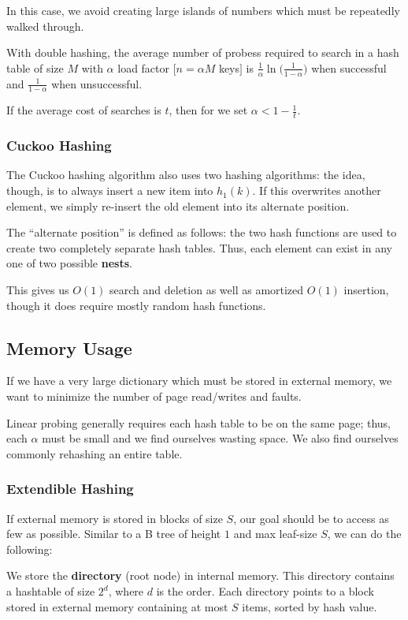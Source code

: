 \documentclass[12pt]{article}
\begin{document}
In this case, we avoid creating large islands of numbers which must be repeatedly walked through.

\begin{theorem}
With double hashing, the average number of probess required to search in a hash table of size $M$ with $\alpha$ load factor $[n = \alpha M$ keys$]$ is $\frac{1}{\alpha} \ln \bigl(\frac{1}{1-\alpha}\bigl)$ when successful and $\frac{1}{1-\alpha}$ when unsuccessful.

If the average cost of searches is $t$, then for we set $\alpha < 1 - \frac{1}{t}$.
\end{theorem}

\subsubsection{Cuckoo Hashing}
The Cuckoo hashing algorithm also uses two hashing algorithms: the idea, though, is to always insert a new item into $h_1(k)$. If this overwrites another element, we simply re-insert the old element into its alternate position.

The ``alternate position'' is defined as follows: the two hash functions are used to create two completely separate hash tables. Thus, each element can exist in any one of two possible {\bf nests}.

This gives us $O(1)$ search and deletion as well as amortized $O(1)$ insertion, though it does require mostly random hash functions.

\subsection{Memory Usage}
If we have a very large dictionary which must be stored in external memory, we want to minimize the number of page read/writes and faults.

Linear probing generally requires each hash table to be on the same page; thus, each $\alpha$ must be small and we find ourselves wasting space. We also find ourselves commonly rehashing an entire table.

\subsubsection{Extendible Hashing}
If external memory is stored in blocks of size $S$, our goal should be to access as few as possible. Similar to a B tree of height $1$ and max leaf-size $S$, we can do the following:

We store the {\bf directory} (root node) in internal memory. This directory contains a hashtable of size $2^d$, where $d$ is the order. Each directory points to a block stored in external memory containing at most $S$ items, sorted by hash value.
\end{document}
